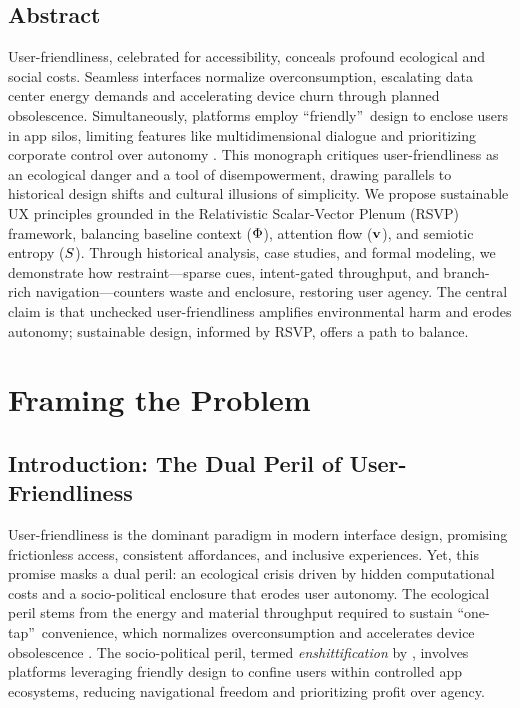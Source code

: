 \chapter*{Abstract}
User-friendliness, celebrated for accessibility, conceals profound ecological and social costs. Seamless interfaces normalize overconsumption, escalating data center energy demands and accelerating device churn through planned obsolescence. Simultaneously, platforms employ \textquotedblleft friendly\textquotedblright\ design to enclose users in app silos, limiting features like multidimensional dialogue and prioritizing corporate control over autonomy \citep{doctorow2022}. This monograph critiques user-friendliness as an ecological danger and a tool of disempowerment, drawing parallels to historical design shifts and cultural illusions of simplicity. We propose sustainable UX principles grounded in the Relativistic Scalar-Vector Plenum (RSVP) framework, balancing baseline context (\(\Phi\)), attention flow (\(\mathbf{v}\)), and semiotic entropy (\(S\)). Through historical analysis, case studies, and formal modeling, we demonstrate how restraint---sparse cues, intent-gated throughput, and branch-rich navigation---counters waste and enclosure, restoring user agency. The central claim is that unchecked user-friendliness amplifies environmental harm and erodes autonomy; sustainable design, informed by RSVP, offers a path to balance.

\clearpage
{}
\tableofcontents
\clearpage
{}

\part{Framing the Problem}

\chapter{Introduction: The Dual Peril of User-Friendliness}
\label{ch:intro}

User-friendliness is the dominant paradigm in modern interface design, promising frictionless access, consistent affordances, and inclusive experiences. Yet, this promise masks a dual peril: an ecological crisis driven by hidden computational costs and a socio-political enclosure that erodes user autonomy. The ecological peril stems from the energy and material throughput required to sustain \textquotedblleft one-tap\textquotedblright\ convenience, which normalizes overconsumption and accelerates device obsolescence \citep{extentia2024}. The socio-political peril, termed \emph{enshittification} by \citet{doctorow2022}, involves platforms leveraging friendly design to confine users within controlled app ecosystems, reducing navigational freedom and prioritizing profit over agency.

